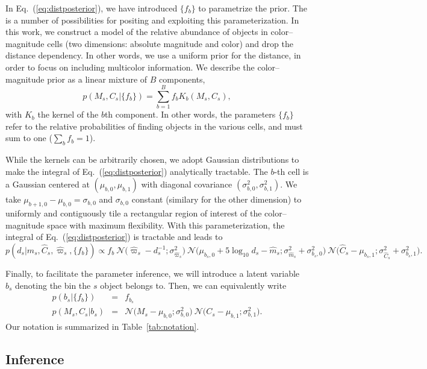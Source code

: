 \documentclass[aps,prd,showpacs,superscriptaddress,groupedaddress]{revtex4}  %
\newcommand{\equref}[1]{{\xspace}Eq.~(\ref{#1})}
\newcommand{\equ}[1]{\begin{equation}#1\end{equation}}
\newcommand{\eqn}[1]{\begin{eqnarray}#1\end{eqnarray}}
\begin{document}
In \equref{eq:distposterior}, we have introduced $\{ f_{b} \}$ to parametrize the prior. 
The is a number of possibilities for positing and exploiting this parameterization.
In this work, we construct a model of the relative abundance of objects in color--magnitude cells (two dimensions: absolute magnitude and color) and drop the distance dependency.
In other words, we use a uniform prior for the distance, in order to focus on including multicolor information.
We describe the color--magnitude prior as a linear mixture of $B$ components,
\equ{
	p\left(M_s, C_s  \bigr\rvert \{ f_{b} \} \right) = \sum_{b=1}^B f_b K_b(M_s, C_s),
} 
with $K_b$ the kernel of the $b$th component. 
In other words, the parameters $\{ f_{b} \}$ refer to the relative probabilities of finding objects in the various cells, and must sum to one ($\sum_b f_b = 1$).

While the kernels can be arbitrarily chosen, we adopt Gaussian distributions to make the integral of \equref{eq:distposterior} analytically tractable.
The $b$-th cell is a Gaussian centered at $(\mu_{b,0}, \mu_{b,1})$  with diagonal covariance $(\sigma_{b,0}^2, \sigma_{b,1}^2)$.
We take $\mu_{b+1,0}-\mu_{b,0} = \sigma_{b,0}$ and $\sigma_{b,0}$ constant (similary for the other dimension) to uniformly and contiguously tile a rectangular region of interest of the color--magnitude space with maximum flexibility. 
With this parameterization, the integral of \equref{eq:distposterior} is tractable and leads to
\equ{
	p(d_s | \hat{m}_s, \hat{C}_s, \hat{\varpi}_s, \{ f_{b} \}) \propto f_b \ \mathcal{N}\bigl(\hat{\varpi}_s - d_s^{-1};\sigma_{\hat{\varpi}_s}^2 \bigr) \  \mathcal{N}\bigl( \mu_{b_s,0} + 5\log_{10}d_s  -\hat{m}_s ;\sigma_{\hat{m}_s}^2 + \sigma_{b_s,0}^2 \bigr) \  \mathcal{N}\bigl(\hat{C}_s - \mu_{b_s,1};\sigma_{\hat{C}_s}^2 + \sigma_{b_s,1}^2 \bigr).
}

Finally, to facilitate the parameter inference, we will introduce a latent variable $b_s$ denoting the bin the $s$ object belongs to.
Then, we can equivalently write
\eqn{
	p\left(b_s \bigr\rvert \bigl\{ f_b \bigr\}\right) &=& f_{b_s} \\ 
	p\left(M_s, C_s \bigr\rvert b_s \right) &=& \mathcal{N}\bigl(M_s - \mu_{b,0};\sigma_{b,0}^2 \bigr)  \ \mathcal{N}\bigl(C_s - \mu_{b,1};\sigma_{b,1}^2 \bigr).
}
Our notation is summarized in Table~\ref{tab:notation}.


\subsection{Inference}
\end{document}
